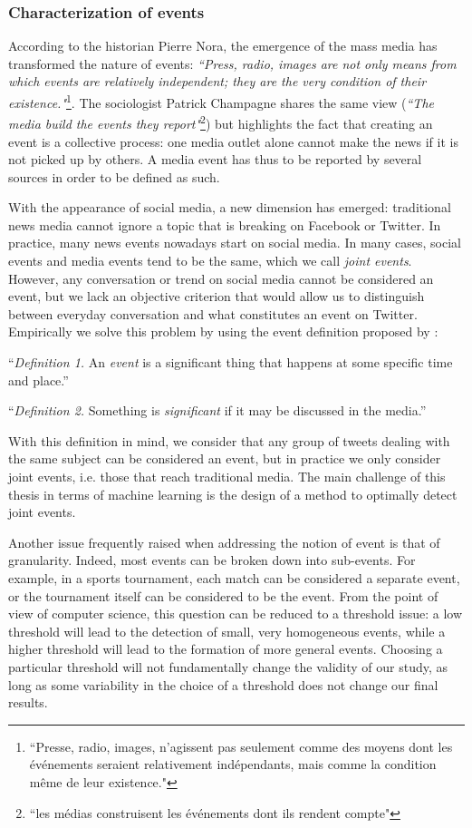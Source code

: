 \subsubsection{Characterization of events}
According to the historian Pierre Nora, the emergence of the mass media has transformed the nature of events: \textit{``Press, radio, images are not only means from which events are relatively independent; they are the very condition of their existence."}\footnote{``Presse, radio, images, n'agissent pas seulement comme des moyens dont les événements seraient relativement indépendants, mais comme la condition même de leur existence."}\citep{nora_evenement_1972}. The sociologist Patrick Champagne \citep{champagne_evenement_2000} shares the same view (\textit{``The media build the events they report"}\footnote{``les médias construisent les événements dont ils rendent compte"}) but highlights the fact that creating an event is a collective process: one media outlet alone cannot make the news if it is not picked up by others. A media event has thus to be reported by several sources in order to be defined as such.

With the appearance of social media, a new dimension has emerged: traditional news media cannot ignore a topic that is breaking on Facebook or Twitter. In practice, many news events nowadays start on social media.  In many cases, social events and media events tend to be the same, which we call \textit{joint events}. However, any conversation or trend on social media cannot be considered an event, but we lack an objective criterion that would allow us to distinguish between everyday conversation and what constitutes an event on Twitter. Empirically we solve this problem by using the event definition proposed by \cite{mcminn_building_2013}:

“\textit{Definition 1.} An \textit{event} is a significant thing that happens
at some specific time and place.”

“\textit{Definition 2.} Something is \textit{significant} if it may be discussed in the media.”

With this definition in mind, we consider that any group of tweets dealing with the same subject can be considered an event, but in practice we only consider joint events, i.e. those that reach traditional media. The main challenge of this thesis in terms of machine learning is the design of a method to optimally detect joint events.

Another issue frequently raised when addressing the notion of event is that of granularity. Indeed, most events can be broken down into sub-events. For example, in a sports tournament, each match can be considered a separate event, or the tournament itself can be considered to be the event. From the point of view of computer science, this question can be reduced to a threshold issue: a low threshold will lead to the detection of small, very homogeneous events, while a higher threshold will lead to the formation of more general events. Choosing a particular threshold will not fundamentally change the validity of our study, as long as some variability in the choice of a threshold does not change our final results.

